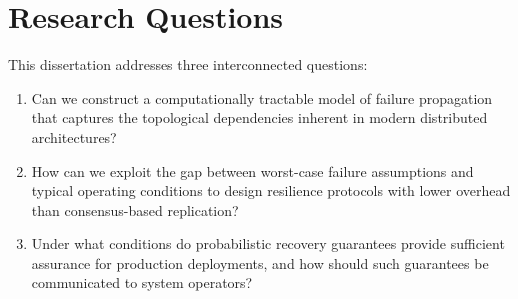 \section{Research Questions}

This dissertation addresses three interconnected questions:

\begin{enumerate}[label=\textbf{RQ\arabic*:},leftmargin=*,itemsep=8pt]
  \item Can we construct a computationally tractable model of failure propagation that captures the topological dependencies inherent in modern distributed architectures?
  \item How can we exploit the gap between worst-case failure assumptions and typical operating conditions to design resilience protocols with lower overhead than consensus-based replication?
  \item Under what conditions do probabilistic recovery guarantees provide sufficient assurance for production deployments, and how should such guarantees be communicated to system operators?
\end{enumerate}
